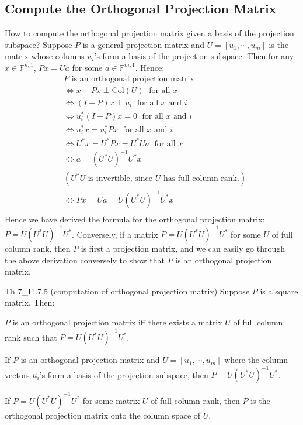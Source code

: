 \documentclass{article}
\begin{document}
\subsection{Compute the Orthogonal Projection Matrix}
How to compute the orthogonal projection matrix given a basis of the projection subspace? Suppose $P$ is a general projection matrix and $U = [u_1, \cdots, u_m]$ is the matrix whose columns $u_i$'s form a basis of the projection subspace. Then for any $x\in\mathbb{F}^{n,1}$, $Px = Ua$ for some $a\in\mathbb{F}^{m,1}$. Hence:
$$
\begin{aligned}
    & P \text{ is an orthogonal projection matrix} \\
    & \Leftrightarrow x-Px\perp \text{Col}(U) \;\text{ for all } x \\
    & \Leftrightarrow (I-P)x\perp u_i \;\text{ for all } x \text{ and } i \\
    & \Leftrightarrow u_i^\ast (I-P)x = 0 \;\text{ for all } x \text{ and } i \\
    & \Leftrightarrow u_i^\ast x = u_i^\ast Px \;\text{ for all } x \text{ and } i \\
    & \Leftrightarrow U^\ast x = U^\ast Px = U^\ast Ua \;\text{ for all } x \\
    & \Leftrightarrow a = (U^\ast U)^{-1}U^\ast x \\ 
    & (U^\ast U \text{ is invertible, since } U \text{ has full column rank.})\\
    & \Leftrightarrow Px = Ua = U(U^\ast U)^{-1}U^\ast x \\
\end{aligned}
$$
Hence we have derived the formula for the orthogonal projection matrix: $P = U(U^\ast U)^{-1}U^\ast$. Conversely, if a matrix $P = U(U^\ast U)^{-1}U^\ast$ for some $U$ of full column rank, then $P$ is first a projection matrix, and we can easily go through the above derivation conversely to show that $P$ is an orthogonal projection matrix.
\begin{Th}{Th 7\_I1.7.5 (computation of orthogonal projection matrix)}
    Suppose $P$ is a square matrix. Then: 
    \begin{compactenum}
        \item $P$ is an orthogonal projection matrix iff there exists a matrix $U$ of full column rank such that $P = U(U^\ast U)^{-1}U^\ast$. 
        \item If $P$ is an orthogonal projection matrix and $U = [u_1, \cdots, u_m]$ where the column-vectors $u_i$'s form a basis of the projection subspace, then $P = U(U^\ast U)^{-1}U^\ast$.
        \item If $P = U(U^\ast U)^{-1}U^\ast$ for some matrix $U$ of full column rank, then $P$ is the orthogonal projection matrix onto the column space of $U$.
    \end{compactenum}
\end{Th}
\end{document}
